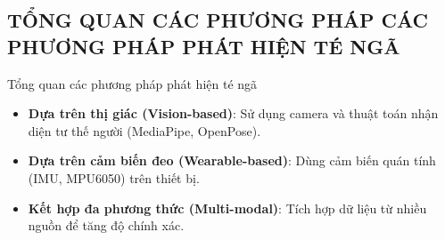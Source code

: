 \subsection{TỔNG QUAN CÁC PHƯƠNG PHÁP CÁC PHƯƠNG PHÁP  PHÁT HIỆN TÉ NGÃ} 
\begin{frame}{Tổng quan các phương pháp phát hiện té ngã}
    \begin{itemize}
        \item \textbf{Dựa trên thị giác (Vision-based)}: Sử dụng camera và thuật toán nhận diện tư thế người (MediaPipe, OpenPose).
        \item \textbf{Dựa trên cảm biến đeo (Wearable-based)}: Dùng cảm biến quán tính (IMU, MPU6050) trên thiết bị.
        \item \textbf{Kết hợp đa phương thức (Multi-modal)}: Tích hợp dữ liệu từ nhiều nguồn để tăng độ chính xác.
    \end{itemize}
\end{frame}

